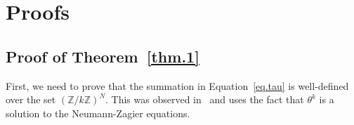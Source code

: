 \documentclass[12pt]{amsart}
\theoremstyle{definition}
\newtheorem{question}[theorem]{Question}
\def\BZ{\mathbb Z}
\def\ga{\gamma}
\def\th{\theta}
\newcommand{\mb}{\mathbf}
\begin{document}
%
%
%
%




\section{Proofs}
\label{sec.proofs}

\subsection{Proof of Theorem~\ref{thm.1}}
\label{sub.proof.thm1}

First, we need to prove that the summation in Equation~\eqref{eq.tau} is
well-defined over the set $(\BZ/k\BZ)^N$. This was observed in~\cite{GZ1}
and uses the fact that $\th^k$ is a solution to the Neumann-Zagier equations.
\end{document}
